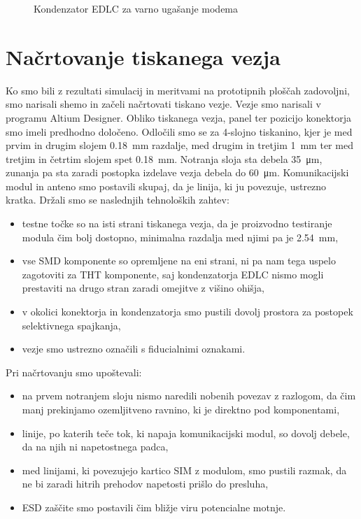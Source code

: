 \documentclass[a4paper,twoside,openright,12pt,slovene]{book}
\begin{document}
\begin{figure}[h]
    \centering
    
    \caption{Kondenzator EDLC za varno ugašanje modema}
    \label{EDLC}
\end{figure}
\newpage
\section{Načrtovanje tiskanega vezja}
Ko smo bili z rezultati simulacij in meritvami na prototipnih ploščah zadovoljni, smo narisali shemo in začeli načrtovati tiskano vezje. Vezje smo narisali v programu Altium Designer. Obliko tiskanega vezja, panel ter pozicijo konektorja smo imeli predhodno določeno. Odločili smo se za 4-slojno tiskanino, kjer je med prvim in drugim slojem \SI{0,18}{\milli\meter} razdalje, med drugim in tretjim \SI{1}{\milli\meter} ter med tretjim in četrtim slojem spet \SI{0,18}{\milli\meter}. Notranja sloja sta debela \SI{35}{\micro\meter}, zunanja pa sta zaradi postopka izdelave vezja debela do \SI{60}{\micro\meter}.
Komunikacijski modul in anteno smo postavili skupaj, da je linija, ki ju povezuje, ustrezno kratka. 
\newpage
Držali smo se naslednjih tehnoloških zahtev:
\begin{itemize}
    \item testne točke so na isti strani tiskanega vezja, da je proizvodno testiranje modula čim bolj dostopno, minimalna razdalja med njimi pa je \SI{2,54}{\milli\meter},
    \item vse SMD komponente so opremljene na eni strani, ni pa nam tega uspelo zagotoviti za THT komponente, saj kondenzatorja EDLC nismo mogli prestaviti na drugo stran zaradi omejitve z višino ohišja,
    \item v okolici konektorja in kondenzatorja smo pustili dovolj prostora za postopek selektivnega spajkanja,
    \item vezje smo ustrezno označili s fiducialnimi oznakami.
\end{itemize}
Pri načrtovanju smo upoštevali:
\begin{itemize}
    \item na prvem notranjem sloju nismo naredili nobenih povezav z razlogom, da čim manj prekinjamo ozemljitveno ravnino, ki je direktno pod komponentami,
    \item linije, po katerih teče tok, ki napaja komunikacijski modul, so dovolj debele, da na njih ni napetostnega padca,
    \item med linijami, ki povezujejo kartico SIM z modulom, smo pustili razmak, da ne bi zaradi hitrih prehodov napetosti prišlo do presluha,
    \item ESD zaščite smo postavili čim bližje viru potencialne motnje.
\end{itemize}
\end{document}

